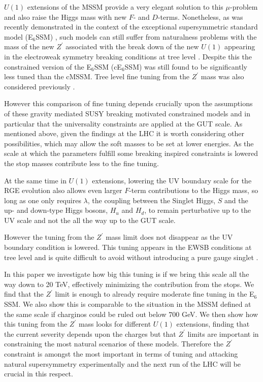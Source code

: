 \documentclass[preprint,amsmath,amssymb,aps,superscriptaddress,prd,
showpacs,floatfix,nofootinbib]{revtex4-1}
\begin{document}
$U(1)$ extensions of the MSSM provide a very elegant solution to this
$\mu$-problem \cite{Fayet:1977yc, Kim:1983dt, Suematsu:1994qm,
  Cvetic:1995rj, Cvetic:1996mf, Jain:1995cb, Nir:1995bu,
  Cvetic:1997ky} and also raise the Higgs mass with new $F$- and
$D$-terms.  Nonetheless, as was recently demonstrated in the context
of the exceptional supersymmetric standard model (E$_6$SSM)
\cite{King:2005jy, King:2005my, Athron:2010zz}, such models can still
suffer from naturalness problems with the mass of the new $Z^\prime$
associated with the break down of the new $U(1)$ appearing in the
electroweak symmetry breaking conditions at tree level
\cite{Athron:2013ipa}.  Despite this the constrained version of the
E$_6$SSM (cE$_6$SSM) \cite{Athron:2009ue, Athron:2009bs} was still
found to be significantly less tuned than the cMSSM.  Tree level
fine tuning from the $Z^\prime$ mass was also considered
previously \cite{Drees:1985js}.

However this comparison of fine tuning depends crucially upon the
assumptions of these gravity mediated SUSY breaking motivated
constrained models and in particular that the universality
constraints are applied at the GUT scale.  As mentioned above, given
the findings at the LHC it is worth considering other possibilities,
which may allow the soft masses to be set at lower energies.  As the
scale at which the parameters fulfill some breaking inspired
constraints is lowered the stop masses contribute less to the fine
tuning.

At the same time in $U(1)$ extensions, lowering the UV boundary scale
for the RGE evolution also allows even larger $F$-term contributions
to the Higgs mass, so long as one only requires $\lambda$, the
coupling between the Singlet Higgs, $S$ and the up- and down-type
Higgs bosons, $H_u$ and $H_d$, to remain perturbative up to the UV
scale and not the all the way up to the GUT scale.

However the tuning from the $Z^\prime$ mass limit does not disappear
as the UV boundary condition is lowered.  This tuning appears in the
EWSB conditions at tree level and is quite difficult to avoid without
introducing a pure gauge singlet \cite{Athron:2014pua}.

In this paper we investigate how big this tuning is if we bring this
scale all the way down to 20 TeV, effectively minimizing the contribution
from the stops.  We find that the $Z^\prime$ limit is enough to already
require moderate fine tuning in the E$_6$SSM.  We also show this is
comparable to the situation in the MSSM defined at the same scale if
charginos could be ruled out below $700$ GeV.  We then show how this
tuning from the $Z^\prime$ mass looks for different $U(1)$ extensions,
finding that the current severity depends upon the charges but that
$Z^\prime$ limits are important in constraining the most natural
scenarios of these models.  Therefore the $Z^\prime$ constraint
is amongst the most important in terms of tuning and attacking natural
supersymmetry experimentally and the next run of the LHC will be
crucial in this respect.
\end{document}
